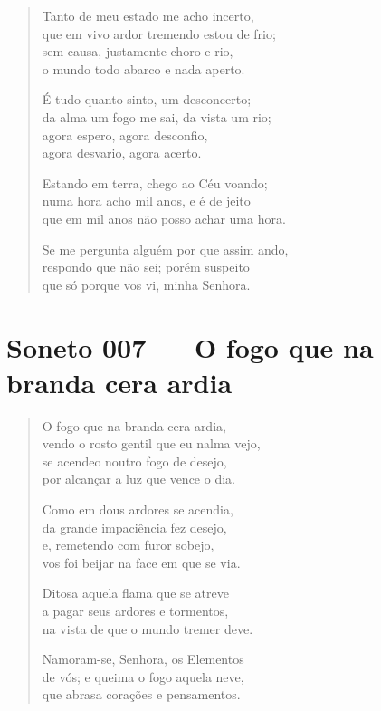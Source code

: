 \documentclass[10pt,a5paper,oneside]{book}
\begin{document}
\begin{verse}
Tanto de meu estado me acho incerto,\\
que em vivo ardor tremendo estou de frio;\\
sem causa, justamente choro e rio,\\
o mundo todo abarco e nada aperto.

É tudo quanto sinto, um desconcerto;\\
da alma um fogo me sai, da vista um rio;\\
agora espero, agora desconfio,\\
agora desvario, agora acerto.

Estando em terra, chego ao Céu voando;\\
numa hora acho mil anos, e é de jeito\\
que em mil anos não posso achar uma hora.

Se me pergunta alguém por que assim ando,\\
respondo que não sei; porém suspeito\\
que só porque vos vi, minha Senhora.
\end{verse}

\chapter{Soneto 007 --- O fogo que na branda cera ardia}

\begin{verse}
O fogo que na branda cera ardia,\\
vendo o rosto gentil que eu nalma vejo,\\
se acendeo noutro fogo de desejo,\\
por alcançar a luz que vence o dia.

Como em dous ardores se acendia,\\
da grande impaciência fez desejo,\\
e, remetendo com furor sobejo,\\
vos foi beijar na face em que se via.

Ditosa aquela flama que se atreve\\
a pagar seus ardores e tormentos,\\
na vista de que o mundo tremer deve.

Namoram-se, Senhora, os Elementos\\
de vós; e queima o fogo aquela neve,\\
que abrasa corações e pensamentos.
\end{verse}
\end{document}
